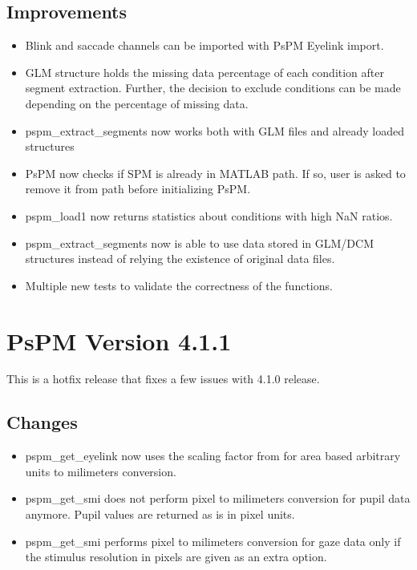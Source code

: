 \documentclass[english]{article}
\numberwithin{equation}{section}
\numberwithin{figure}{section}
\begin{document}
\subsection*{Improvements}
\begin{itemize}
\item Blink and saccade channels can be imported with PsPM Eyelink import.
\item GLM structure holds the missing data percentage of each condition
after segment extraction. Further, the decision to exclude conditions
can be made depending on the percentage of missing data.
\item pspm\_extract\_segments now works both with GLM files and already
loaded structures
\item PsPM now checks if SPM is already in MATLAB path. If so, user is asked
to remove it from path before initializing PsPM.
\item pspm\_load1 now returns statistics about conditions with high NaN
ratios.
\item pspm\_extract\_segments now is able to use data stored in GLM/DCM
structures instead of relying the existence of original data files.
\item Multiple new tests to validate the correctness of the functions.
\end{itemize}

\section{PsPM Version 4.1.1}

This is a hotfix release that fixes a few issues with 4.1.0 release.

\subsection*{Changes}
\begin{itemize}
\item pspm\_get\_eyelink now uses the scaling factor from \cite{Hayes:2015a}
for area based arbitrary units to milimeters conversion.
\item pspm\_get\_smi does not perform pixel to milimeters conversion for
pupil data anymore. Pupil values are returned as is in pixel units.
\item pspm\_get\_smi performs pixel to milimeters conversion for gaze data
only if the stimulus resolution in pixels are given as an extra option.
\end{itemize}
\end{document}
